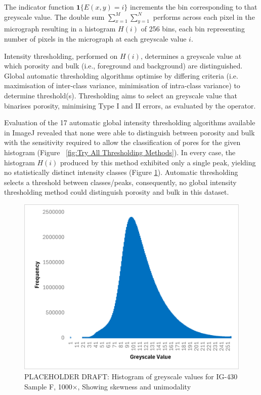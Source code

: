 \documentclass[review]{elsarticle}
\begin{document}
The indicator function \(\mathbf{1}\{E(x,y)=i\}\) increments the bin
corresponding to that greyscale value. The double sum
\(\sum_{x=1}^M\sum_{y=1}^N\) performs  across each pixel in the micrograph
resulting in a histogram \(H(i)\) of 256 bins, each bin representing number of
pixels in the micrograph at each greyscale value \(i\). 

Intensity thresholding, performed on \(H(i)\), determines a greyscale value at
which porosity and bulk (i.e., foreground and background) are distinguished.
Global automatic thresholding algorithms optimise by differing criteria (i.e.
maximisation of inter-class variance, minimisation of intra-class variance) to
determine threshold(s). Thresholding aims to select an greyscale value that
binarises porosity, minimising Type I and II errors, as evaluated by the
operator.

Evaluation of the 17 automatic global intensity thresholding algorithms
available in ImageJ revealed that none were able to distinguish between porosity
and bulk with the sensitivity required to allow the classification of pores for
the given histogram (Figure ~\ref{fig:Try All Thresholding Methods}). In every
case, the histogram \(H(i)\) produced by this method exhibited only a single
peak, yielding no statistically distinct intensity classes (Figure
\ref{fig:histogramnobimodal}). Automatic thresholding selects a threshold
between classes/peaks, consequently, no global intensity thresholding method
could distinguish porosity and bulk in this dataset.

    \begin{figure}
		\centering
    \includegraphics[width=0.9\columnwidth]{./Media/IG430F Greyscale Histogram.png}
		\caption{PLACEHOLDER DRAFT: Histogram of greyscale values for IG-430 Sample F, 1000×, Showing skewness and unimodality}
		\label{fig:histogramnobimodal}
	\end{figure} 
\end{document}
